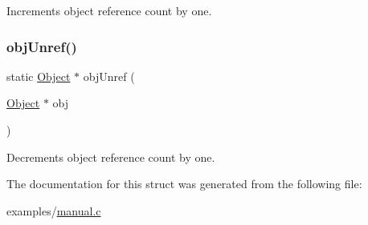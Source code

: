 Increments object reference count by one. \mbox{\label{struct_object_a924ee0cecc906d148022b3f0d6325cfb}} 
\subsubsection{\texorpdfstring{obj\+Unref()}{objUnref()}}
{\footnotesize\ttfamily static \hyperlink{struct_object}{Object} $\ast$ obj\+Unref (\begin{DoxyParamCaption}\item[{\hyperlink{struct_object}{Object} $\ast$}]{obj }\end{DoxyParamCaption})}

Decrements object reference count by one. 

The documentation for this struct was generated from the following file\+:\begin{DoxyCompactItemize}
\item 
examples/\hyperlink{manual_8c}{manual.\+c}\end{DoxyCompactItemize}
